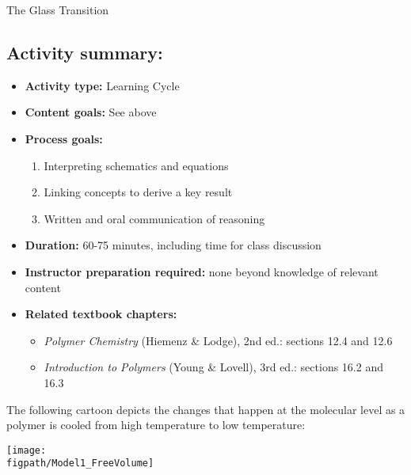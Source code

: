 \begin{activity}{The Glass Transition}
\begin{instructornotes}
	\subsection*{Activity summary:}
	\begin{itemize}
		\item \textbf{Activity type:} Learning Cycle
		\item \textbf{Content goals:} See above %
		\item \textbf{Process goals:} %
			\begin{enumerate}
				\item Interpreting schematics and equations
				\item Linking concepts to derive a key result
				\item Written and oral communication of reasoning
			\end{enumerate}
		\item \textbf{Duration:} 60-75 minutes, including time for class discussion
		\item \textbf{Instructor preparation required:} none beyond knowledge of relevant content
		\item \textbf{Related textbook chapters:}
			\begin{itemize}
				\item \emph{Polymer Chemistry} (Hiemenz \& Lodge), 2nd ed.: sections 12.4 and 12.6
				\item \emph{Introduction to Polymers} (Young \& Lovell), 3rd ed.: sections 16.2 and 16.3
			\end{itemize}
	\end{itemize}
	
\end{instructornotes}


\begin{model}
	\label{\labelbase:mdl:freevolume}
	
	The following cartoon depicts the changes that happen at the molecular level as a polymer is cooled from high temperature to low temperature:
	
	\centerline{\texttt{[image: \\figpath/Model1\_FreeVolume]}}
	

\end{model}
\end{activity}
